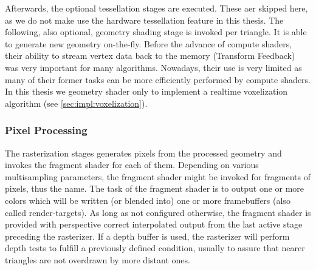 \documentclass[thesis.tex]{subfiles}
\begin{document}
Afterwards, the optional tessellation stages are executed.
These aer skipped here, as we do not make use the hardware tessellation feature in this thesis.
The following, also optional, geometry shading stage is invoked per triangle.
It is able to generate new geometry on-the-fly.
Before the advance of compute shaders, their ability to stream vertex data back to the memory (Transform Feedback) was very important for many algorithms.
Nowadays, their use is very limited as many of their former tasks can be more efficiently performed by compute shaders.
In this thesis we geometry shader only to implement a realtime voxelization algorithm (see \autoref{sec:impl:voxelization}).


\subsubsection{Pixel Processing}
The rasterization stages generates pixels from the processed geometry and invokes the fragment shader for each of them.
Depending on various multisampling parameters, the fragment shader might be invoked for fragments of pixels, thus the name.
The task of the fragment shader is to output one or more colors which will be written (or blended into) one or more framebuffers (also called render-targets).
As long as not configured otherwise, the fragment shader is provided with perspective correct interpolated output from the last active stage preceding the rasterizer.
If a depth buffer is used, the rasterizer will perform depth tests to fulfill a previously defined condition, usually to assure that nearer triangles are not overdrawn by more distant ones.
\end{document}
